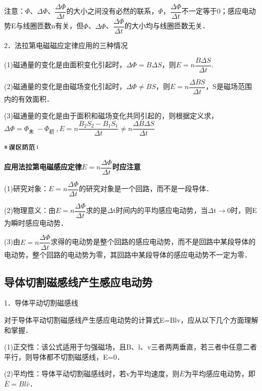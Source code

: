 \documentclass[cn,10.5pt,chinese,mac,chinesefont=founder]{elegantbook}
\begin{document}
注意：$\Phi$、$\Delta \Phi$、$\dfrac{\Delta\Phi}{\Delta t}$的大小之间没有必然的联系，$\Phi$，$\dfrac{\Delta\Phi}{\Delta t}$不一定等于0；感应电动势E与线圈匝数n有关，但$\Phi$、$\Delta \Phi$、$\dfrac{\Delta\Phi}{\Delta t}$的大小均与线圈匝数无关．

2．法拉第电磁磁应定律应用的三种情况

(1)磁通量的变化是由面积变化引起时，$\Delta \Phi=B\Delta S$，则$E=n \dfrac{B \Delta S}{\Delta t}$.　

(2)磁通量的变化是由磁场变化引起时，$\Delta \Phi \neq BS$，则$E=n \dfrac{ \Delta BS}{\Delta t}$，S是磁场范围内的有效面积．

(3)磁通量的变化是由于面积和磁场变化共同引起的，则根据定义求，$\Delta \Phi=\Phi_{\text {末 }}-\Phi_{\text {初 }}, E=n \dfrac{B_{2} S_{2}-B_{1} S_{1}}{\Delta t} \neq n \dfrac{\Delta B \Delta S}{\Delta t}$

\begin{center}\includegraphics[width=0.70764in,height=0.12292in]{media/image34.png}\end{center}
\begin{center}
	\textbf{应用法拉第电磁感应定律$E=n \dfrac{\Delta \Phi}{\Delta t}$时应注意}
\end{center}


(1)研究对象：$E=n \dfrac{\Delta \Phi}{\Delta t}$的研究对象是一个回路，而不是一段导体．

(2)物理意义：由$E=n \dfrac{\Delta \Phi}{\Delta t}$求的是$\Delta$t时间内的平均感应电动势，当$\Delta$t$\rightarrow$0时，则E为瞬时感应电动势．

(3)由$E=n \dfrac{\Delta \Phi}{\Delta t}$求得的电动势是整个回路的感应电动势，而不是回路中某段导体的电动势，整个回路的电动势为零，其回路中某段导体的感应电动势不一定为零．

\newpage
\subsection{导体切割磁感线产生感应电动势}

1．导体平动切割磁感线

对于导体平动切割磁感线产生感应电动势的计算式E=Blv，应从以下几个方面理解和掌握．

(1)正交性：该公式适用于匀强磁场，且B、l、v三者两两垂直，若三者中任意二者平行，则导体都不切割磁感线，E=0．

(2)平均性：导体平动切割磁感线时，若v为平均速度，则$\bar E$为平均感应电动势，即$\bar E =Bl\bar v$．
\end{document}
